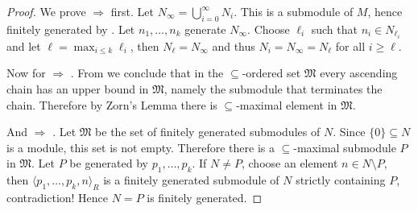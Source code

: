 \documentclass[a4paper,parskip=half,numbers=enddot, DIV=12]{scrreprt}
\renewcommand{\geq}{\geqslant}
\renewcommand{\leq}{\leqslant}
\begin{document}
	\begin{proof}
		We prove  $\Rightarrow$  first. Let $N_\infty = \bigcup_{i=0}^\infty N_i$. This is a submodule of $M$, hence finitely generated by . Let $n_1,\ldots, n_k$ generate $N_\infty$. Choose $\ell_i$ such that $n_i\in N_{\ell_i}$ and let $\ell = \max_{i\leq k}\ell_i$, then $N_\ell = N_\infty$ and thus $N_i=N_\infty=N_\ell$ for all $i\geq \ell$.
		
		Now for  $\Rightarrow$ . From  we conclude that in the $\subseteq$-ordered set $\mathfrak{M}$ every ascending chain has an upper bound in $\mathfrak{M}$, namely the submodule that terminates the chain. Therefore by Zorn's Lemma there is $\subseteq$-maximal element in $\mathfrak{M}$.
		
		And  $\Rightarrow$ . Let $\mathfrak{M}$ be the set of finitely generated submodules of $N$. Since $\{0\}\subseteq N$ is a module, this set is not empty. Therefore there is a $\subseteq$-maximal submodule $P$ in $\mathfrak{M}$. Let $P$ be generated by $p_1,\ldots, p_k$. If $N\neq P$, choose an element $n\in N\setminus P$, then $\langle p_1,\ldots, p_k, n\rangle_R$ is a finitely generated submodule of $N$ strictly containing $P$, contradiction! Hence $N=P$ is finitely generated.
	\end{proof}
	
\end{document}
